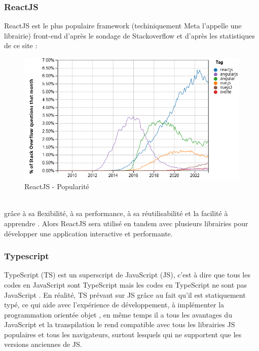\documentclass{template}
\begin{document}
\subsubsection{ReactJS}
ReactJS est le plus populaire framework (techiniquement Meta l'appelle une librairie) front-end d'après le sondage de Stackoverflow \cite{webFrameworks} et d'après les statistiques de ce site :
\begin{figure}[h!]
    \includegraphics[scale=0.4]{Pics/stackoveflowchart.png}
    \centering
    \caption{ReactJS - Popularité \cite{stackoverflowChart}}
\end{figure}
\\
grâce à sa flexibilité, à sa performance, à sa réutilisabilité et la facilité à apprendre \cite{bocasayDveloppementQuestce}. Alors ReactJS sera utilisé en tandem avec plusieurs librairies pour développer une application interactive et performante.  
\subsubsection{Typescript}
TypeScript (TS) est un superscript de JavaScript (JS), c'est à dire que tous les codes en JavaScript sont TypeScript mais les codes en TypeScript ne sont pas JavaScript \cite{devTypeScriptBetter}. En réalité, TS prévaut sur JS grâce au fait qu'il est statiquement typé, ce qui aide avec l'expérience de développement, à implémenter la programmation orientée objet \cite{geeksforgeeksReasonsShould}, en même temps il a tous les avantages du JavaScript et la transpilation le rend compatible avec tous les librairies JS populaires et tous les navigateurs, surtout lesquels qui ne supportent que les versions anciennes de JS.
\end{document}
